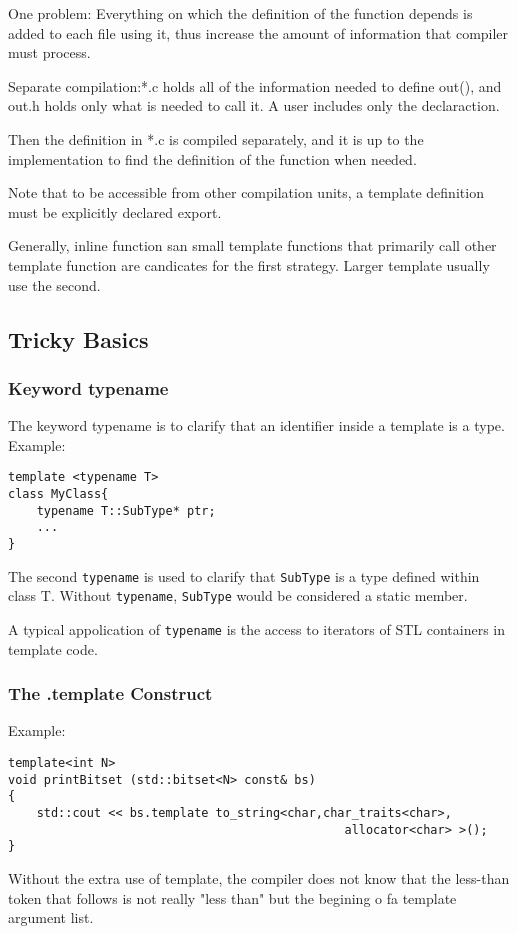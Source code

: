 \documentclass[a4paper,12pt]{book}
\begin{document}
One problem: Everything on which the definition of the function depends is added to each file using it, thus increase the amount of information that compiler must process.

Separate compilation:*.c holds all of the information needed to define out(), and out.h holds only what is needed to call it. A user includes only the declaraction.

Then the definition in *.c is compiled separately, and it is up to the implementation to find the definition of the function when needed.

Note that to be accessible from other compilation units, a template definition must be explicitly declared export.

Generally, inline function san small template functions that primarily call other template function are candicates for the first strategy. Larger template usually use the second.
\subsection{Tricky Basics}
\subsubsection{Keyword typename}
The keyword typename is to clarify that an identifier inside a template is a type. Example:
\begin{verbatim}
template <typename T>
class MyClass{
    typename T::SubType* ptr;
    ...
}
\end{verbatim}
The second \verb|typename| is used to clarify that \verb|SubType| is a type defined within class T. Without \verb|typename|, \verb|SubType| would be considered a static member.

A typical appolication of \verb|typename| is the access to iterators of STL containers in template code.

\subsubsection{The .template Construct}
Example:
\begin{verbatim}
template<int N> 
void printBitset (std::bitset<N> const& bs) 
{ 
    std::cout << bs.template to_string<char,char_traits<char>, 
	                                           allocator<char> >(); 
}
\end{verbatim}
Without the extra use of template, the compiler does not know that the less-than token that follows is not really "less than" but the begining o fa template argument list.
\end{document}
